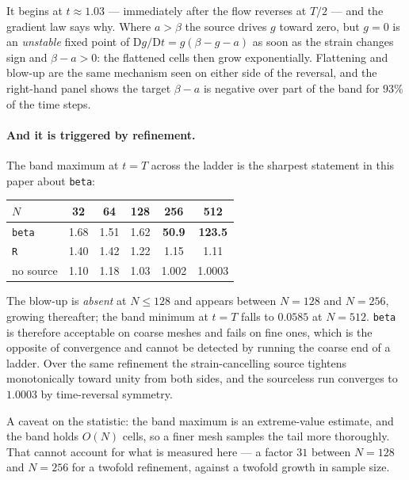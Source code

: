 \documentclass[preprint,3p,11pt]{elsarticle}
\begin{document}
It begins at $t \approx 1.03$ --- immediately after the flow reverses at $T/2$
--- and the gradient law says why. Where $a > \beta$ the source drives $g$ toward
zero, but $g=0$ is an \emph{unstable} fixed point of
$\mathrm{D}g/\mathrm{D}t = g(\beta - g - a)$ as soon as the strain changes sign
and $\beta - a > 0$: the flattened cells then grow exponentially. Flattening and
blow-up are the same mechanism seen on either side of the reversal, and the
right-hand panel shows the target $\beta - a$ is negative over part of the band
for $93\%$ of the time steps.

\paragraph{And it is triggered by refinement.}
The band maximum at $t=T$ across the ladder is the sharpest statement in this
paper about \texttt{beta}:
\begin{center}
\begin{tabular}{lccccc}
\toprule
$N$ & 32 & 64 & 128 & 256 & 512 \\
\midrule
\texttt{beta}     & 1.68 & 1.51 & 1.62 & \textbf{50.9} & \textbf{123.5} \\
\texttt{R}        & 1.40 & 1.42 & 1.22 & 1.15 & 1.11 \\
no source         & 1.10 & 1.18 & 1.03 & 1.002 & 1.0003 \\
\bottomrule
\end{tabular}
\end{center}
The blow-up is \emph{absent} at $N \le 128$ and appears between $N=128$ and
$N=256$, growing thereafter; the band minimum at $t=T$ falls to $0.0585$ at
$N=512$. \texttt{beta} is therefore acceptable on coarse meshes and fails on
fine ones, which is the opposite of convergence and cannot be detected by
running the coarse end of a ladder. Over the same refinement the
strain-cancelling source tightens monotonically toward unity from both sides,
and the sourceless run converges to $1.0003$ by time-reversal symmetry.

A caveat on the statistic: the band maximum is an extreme-value estimate, and
the band holds $O(N)$ cells, so a finer mesh samples the tail more thoroughly.
That cannot account for what is measured here --- a factor $31$ between $N=128$
and $N=256$ for a twofold refinement, against a twofold growth in sample size.
\end{document}
